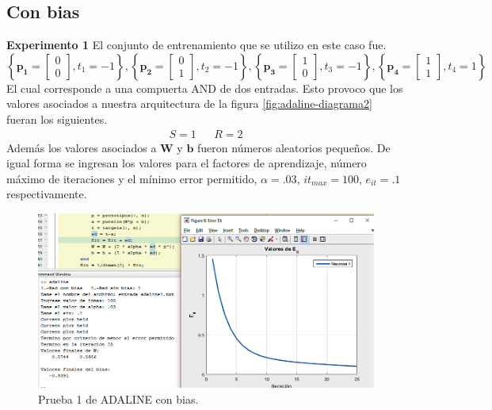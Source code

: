 \documentclass[12pt, titlepage]{article}
\begin{document}
    \subsection{Con bias}
    \textbf{Experimento 1}
    El conjunto de entrenamiento que se utilizo en este caso fue.
    \[ \left\lbrace \boldsymbol{p_1} = \left[\begin{array}{c} 0\\ 0\end{array}\right], t_1 = -1  \right\rbrace, \left\lbrace \boldsymbol{p_2} = \left[\begin{array}{c} 0\\ 1\end{array}\right], t_2 = -1  \right\rbrace, \left\lbrace \boldsymbol{p_3} = \left[\begin{array}{c} 1\\ 0\end{array}\right], t_3 = -1  \right\rbrace, \left\lbrace \boldsymbol{p_4} = \left[\begin{array}{c} 1\\ 1\end{array}\right], t_4 = 1  \right\rbrace  \]
    El cual corresponde a una compuerta AND de dos entradas. Esto provoco que los valores asociados a nuestra arquitectura de la figura \ref{fig:adaline-diagrama2} fueran los siguientes.
    \begin{align*}
    S=1 && R=2
    \end{align*}
    Además los valores asociados a $\boldsymbol{W}$ y $\boldsymbol{b}$ fueron números aleatorios pequeños. De igual forma se ingresan los valores para el factores de aprendizaje, número máximo de iteraciones y el mínimo error permitido, $\alpha=.03$, $it_{max}=100$, $e_{it}=.1$ respectivamente.
    \begin{figure}[H]
        \begin{center}
            \includegraphics[width=16cm]{img/adaline1/error.png}
            \caption{Prueba 1 de ADALINE con bias.}
            \label{fig:adaline1error}
        \end{center}
    \end{figure}
\end{document}
